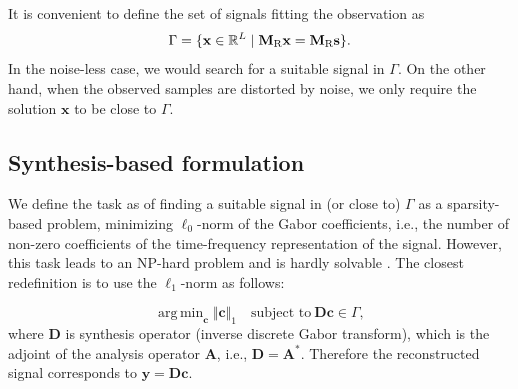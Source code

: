 \documentclass[conference]{IEEEtran}
\newcommand{\todo}[1]{\textcolor{red}{#1}}
\begin{document}
It is convenient to define the set of signals fitting the observation as
\begin{equation}
	\label{eq:Gamma}
	\Gamma = \lbrace \mathbf{x}\in \mathbb {R}^L\mid \mathbf{M}_{\textup{R}}\mathbf{x}=\mathbf{M}_{\textup{R}}\mathbf {s}\rbrace.
\end{equation}
In the noise-less case, we would search for a suitable signal in $\Gamma$.
On the other hand, when the observed samples are distorted by noise, we only require the solution $\mathbf{x}$ to be close to $\Gamma$.

\subsection{Synthesis-based formulation}\label{subsec:freqcoef}

We define the task as of finding a suitable signal in (or close to) $\Gamma$ as a sparsity-based problem, minimizing $ \ell_0 $-norm of the Gabor coefficients, i.e., the number of non-zero coefficients of the time-frequency representation of the signal.
However, this task leads to an NP-hard problem and is hardly solvable \cite{Mokry2020}.
The closest redefinition is to use the $ \ell_1 $-norm as follows:

\begin{equation}
	\label{eq:synthesis.gamma}
	\mathop {\operatorname{arg \, min}}_\mathbf {c}\Vert \mathbf {c}\Vert _1 \quad \text{subject to}\ \mathbf{D}\mathbf {c}\in \Gamma,
\end{equation} 
where $\mathbf{D} $ is synthesis operator (inverse discrete Gabor transform), which is the adjoint of the analysis operator $ \mathbf{A} $, i.e., $ \mathbf{D} = \mathbf{A}^* $.
Therefore the reconstructed signal corresponds to $ \mathbf {y} =  \mathbf{D}\mathbf {c}$.

\end{document}
